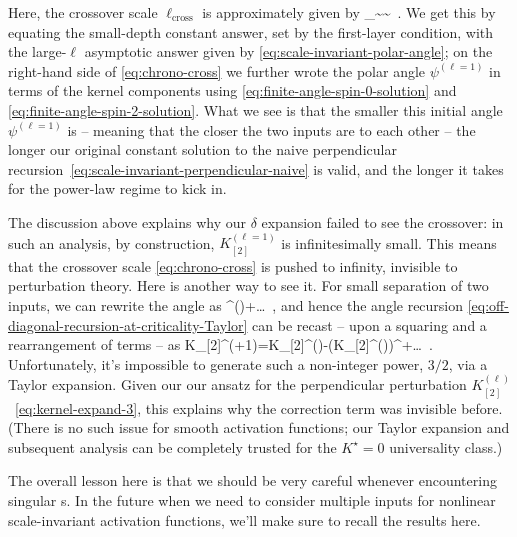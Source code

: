 Here, the crossover scale $\ell_{\text{cross}}$ is approximately given by
\be\label{eq:chrono-cross}
 \ell_{}\sim{}\sim{}\, .
\ee 
We get this 
by equating the small-depth constant answer, set by the first-layer condition, with the large-$\ell$ asymptotic answer given by \eqref{eq:scale-invariant-polar-angle}; on the right-hand side of \eqref{eq:chrono-cross} we further wrote the polar angle $\psi^{(\ell=1)}$ in terms of the kernel components using \eqref{eq:finite-angle-spin-0-solution} and \eqref{eq:finite-angle-spin-2-solution}.
What we see is that the smaller this initial angle $\psi^{(\ell=1)}$ is -- meaning that the closer the two inputs are to each other -- the longer our original constant solution to the naive perpendicular recursion~\eqref{eq:scale-invariant-perpendicular-naive} is valid, and the longer it takes for the power-law regime to kick in. 


The discussion above explains why our $\delta$ expansion failed to see the crossover: in such an analysis, by construction, $K_{[2]}^{(\ell=1)}$ is infinitesimally small. This means that the crossover scale \eqref{eq:chrono-cross} is pushed to infinity, invisible to perturbation theory. Here is another way to see it. For small separation of two inputs, we can rewrite the angle as
\be
\psi^{(\ell)}+\ldots \, ,
\ee
and hence the angle recursion \eqref{eq:off-diagonal-recursion-at-criticality-Taylor} can be recast -- upon a squaring and a rearrangement of terms -- as
\be
\delta\delta K_{[2]}^{(\ell+1)}=\delta\delta K_{[2]}^{(\ell)}-\frac{4\rho}{3\sqrt{\Kdif}}\le(\delta\delta K_{[2]}^{(\ell)}\ri)^{}+\ldots\, .
\ee
Unfortunately, it's impossible to generate such a non-integer power, $3/2$, via a Taylor expansion.  Given our our ansatz for the perpendicular perturbation $K_{[2]}^{(\ell)}$~\eqref{eq:kernel-expand-3}, this explains why the correction term was invisible before. (There is no such issue for smooth activation functions; our Taylor expansion and subsequent analysis can be completely trusted for the $K^\star=0$ universality class.)







The overall lesson here is that we should
be very careful whenever encountering singular s.
In the future when we need to consider multiple inputs for nonlinear scale-invariant activation functions, we'll make sure to recall the results here.



 







































